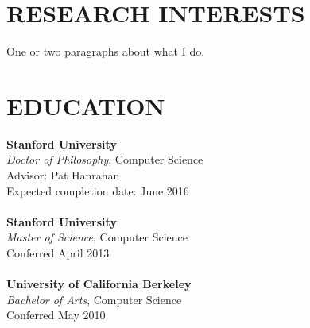 \documentclass[line,margin]{res}
\begin{document}
\address{\url{dritchie@stanford.edu} | \url{stanford.edu/~dritchie}}
\address{353 Serra Mall \#381, Stanford, CA 94305}
 
\begin{resume}

\section{RESEARCH INTERESTS}
One or two paragraphs about what I do.
 
\section{EDUCATION}
\textbf{Stanford University} \\
\emph{Doctor of Philosophy}, Computer Science \\
Advisor: Pat Hanrahan \\
Expected completion date: June 2016 \\
\\
\textbf{Stanford University} \\
\emph{Master of Science}, Computer Science \\
Conferred April 2013 \\
\\
\textbf{University of California Berkeley} \\
\emph{Bachelor of Arts}, Computer Science \\
Conferred May 2010 \\



\end{resume}
\end{document}
